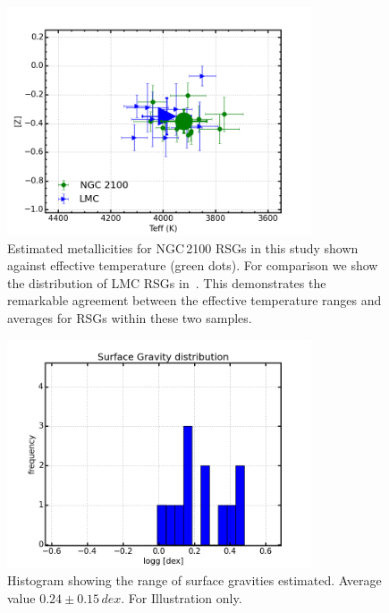 \documentclass[useAMS,usenatbib]{mn2e}
\begin{document}
\begin{figure}
 \includegraphics[width=9.0cm]{NGC2100-TeffvsZ-2100-LMC}
 \caption{Estimated metallicities for NGC\,2100 RSGs in this study shown against effective temperature (green dots).
        For comparison we show the distribution of LMC RSGs in~\citet[blue triangles][]{2015ApJ...806...21D}.
        This demonstrates the remarkable agreement between the effective temperature ranges and averages for RSGs within these two samples.
\label{fig:TeffvsZ}
          }
\end{figure}

\begin{figure}
 \includegraphics[width=9.0cm]{NGC2100-logg-dist-v6}
 \caption{Histogram showing the range of surface gravities estimated. Average value $0.24\pm0.15\,dex$.
 For Illustration only.\label{fig:TeffvsZ}
          }
\end{figure}



\end{document}
